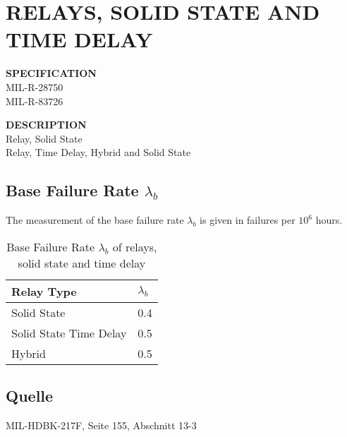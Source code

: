 \section{RELAYS, SOLID STATE AND TIME DELAY}

\begin{minipage}[t]{0.29\textwidth}
    \textbf{SPECIFICATION}\\
    MIL-R-28750\\MIL-R-83726
\end{minipage}
\begin{minipage}[t]{0.7\textwidth}
    \textbf{DESCRIPTION}\\
    Relay, Solid State \\
    Relay, Time Delay, Hybrid and Solid State
\end{minipage}

\subsection{Base Failure Rate $\lambda_b$}
The measurement of the base failure rate $\lambda_b$ is given in failures per $10^6$ hours.
\begin{table}[ht]
{\centering

\begin{tabular}{|p{7.5cm}|p{5cm}|}
    \hline
    \textbf{Relay Type} & \textbf{$\lambda_b$} \\
    \hline
    Solid State & 0.4 \\
    \hline
    Solid State Time Delay & 0.5 \\
    \hline
    Hybrid & 0.5 \\
    \hline
\end{tabular}

\caption{Base Failure Rate $\lambda_b$ of relays, solid state and time delay}

\label{tab:bfr_relays_solid_state_and_time_delay}
\par}
\end{table}
\subsection*{Quelle}
MIL-HDBK-217F, Seite 155, Abschnitt 13-3